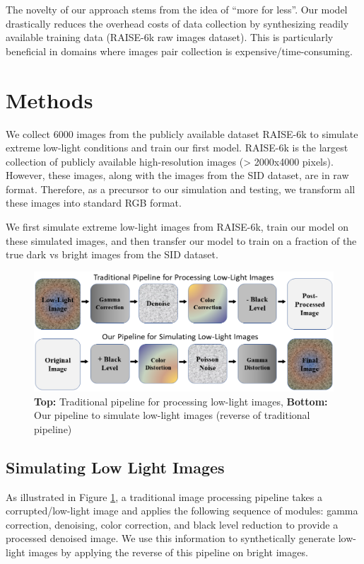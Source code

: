 \documentclass{article}
\begin{document}
The novelty of our approach stems from the idea of ``more for less''. Our
model drastically reduces the overhead costs of data collection by
synthesizing readily available training data (RAISE-6k raw images dataset).
This is particularly beneficial in domains where images pair collection is
expensive/time-consuming.

\section{Methods}

We collect 6000 images from the publicly available dataset RAISE-6k to simulate extreme low-light conditions and train our first model. RAISE-6k is the largest collection of publicly available high-resolution images (> 2000x4000 pixels). However, these images, along with the images from the SID dataset, are in raw format. Therefore, as a precursor to our simulation and testing, we transform all these images into standard RGB format. 

We first simulate extreme low-light images from RAISE-6k, train our model on these simulated images, and then transfer our model to train on a fraction of the true dark vs bright images from the SID dataset.

\begin{figure}[t!]
  \centering
  \includegraphics[scale=0.35]{simulation_flowchart}
  \caption{\textbf{Top:} Traditional pipeline for processing low-light images,            \textbf{Bottom:} Our pipeline to simulate low-light images (reverse of traditional pipeline)}
  \label{fig: simulation pipeline}
\end{figure}

\subsection{Simulating Low Light Images}
As illustrated in Figure \ref{fig: simulation pipeline}, a traditional image processing pipeline takes a corrupted/low-light image and applies the following sequence of modules: gamma correction, denoising, color correction, and black level reduction to provide a processed denoised image. We use this information to synthetically generate low-light images by applying the reverse of this pipeline on bright images. 
\end{document}

